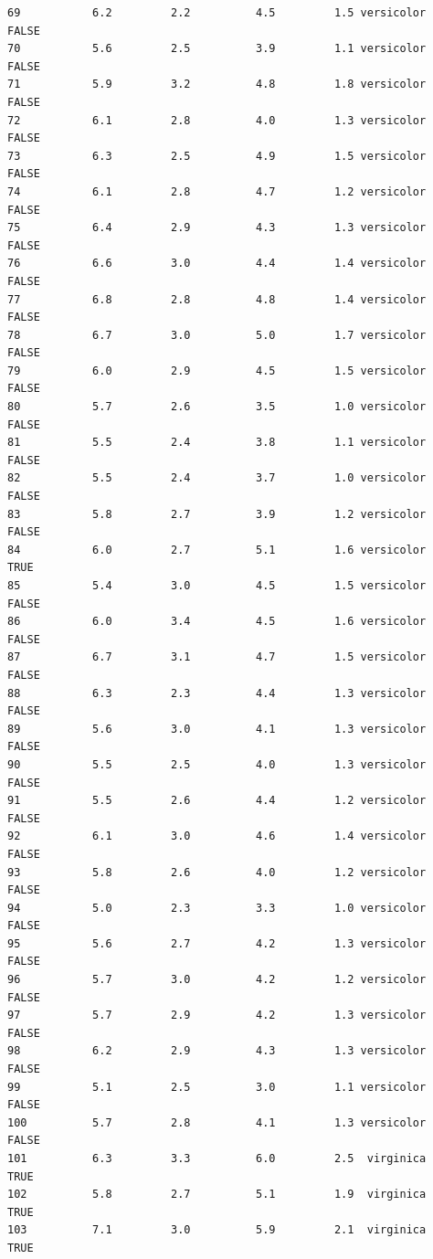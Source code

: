 \documentclass[
  letterpaper,
  DIV=11,
  numbers=noendperiod]{scrreprt}
\begin{document}
\begin{verbatim}
69           6.2         2.2          4.5         1.5 versicolor     FALSE
70           5.6         2.5          3.9         1.1 versicolor     FALSE
71           5.9         3.2          4.8         1.8 versicolor     FALSE
72           6.1         2.8          4.0         1.3 versicolor     FALSE
73           6.3         2.5          4.9         1.5 versicolor     FALSE
74           6.1         2.8          4.7         1.2 versicolor     FALSE
75           6.4         2.9          4.3         1.3 versicolor     FALSE
76           6.6         3.0          4.4         1.4 versicolor     FALSE
77           6.8         2.8          4.8         1.4 versicolor     FALSE
78           6.7         3.0          5.0         1.7 versicolor     FALSE
79           6.0         2.9          4.5         1.5 versicolor     FALSE
80           5.7         2.6          3.5         1.0 versicolor     FALSE
81           5.5         2.4          3.8         1.1 versicolor     FALSE
82           5.5         2.4          3.7         1.0 versicolor     FALSE
83           5.8         2.7          3.9         1.2 versicolor     FALSE
84           6.0         2.7          5.1         1.6 versicolor      TRUE
85           5.4         3.0          4.5         1.5 versicolor     FALSE
86           6.0         3.4          4.5         1.6 versicolor     FALSE
87           6.7         3.1          4.7         1.5 versicolor     FALSE
88           6.3         2.3          4.4         1.3 versicolor     FALSE
89           5.6         3.0          4.1         1.3 versicolor     FALSE
90           5.5         2.5          4.0         1.3 versicolor     FALSE
91           5.5         2.6          4.4         1.2 versicolor     FALSE
92           6.1         3.0          4.6         1.4 versicolor     FALSE
93           5.8         2.6          4.0         1.2 versicolor     FALSE
94           5.0         2.3          3.3         1.0 versicolor     FALSE
95           5.6         2.7          4.2         1.3 versicolor     FALSE
96           5.7         3.0          4.2         1.2 versicolor     FALSE
97           5.7         2.9          4.2         1.3 versicolor     FALSE
98           6.2         2.9          4.3         1.3 versicolor     FALSE
99           5.1         2.5          3.0         1.1 versicolor     FALSE
100          5.7         2.8          4.1         1.3 versicolor     FALSE
101          6.3         3.3          6.0         2.5  virginica      TRUE
102          5.8         2.7          5.1         1.9  virginica      TRUE
103          7.1         3.0          5.9         2.1  virginica      TRUE

\end{verbatim}
\end{document}

